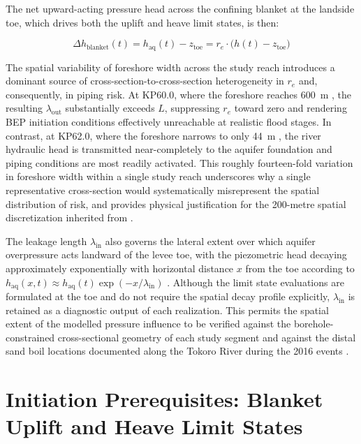 The net upward-acting pressure head across the confining blanket at the landside toe,
which drives both the uplift and heave limit states, is then:

$$\Delta h_\mathrm{blanket}(t) = h_\mathrm{aq}(t) - z_\mathrm{toe}
= r_e \cdot \bigl(h(t) - z_\mathrm{toe}\bigr)$$

The spatial variability of foreshore width across the study reach introduces a dominant
source of cross-section-to-cross-section heterogeneity in $r_e$ and, consequently, in
piping risk. At KP60.0, where the foreshore reaches 600~m \parencite{oyo_1999}, the
resulting $\lambda_\mathrm{out}$ substantially exceeds $L$, suppressing $r_e$ toward
zero and rendering BEP initiation conditions effectively unreachable at realistic flood
stages. In contrast, at KP62.0, where the foreshore narrows to only 44~m
\parencite{oyo_1999}, the river hydraulic head is transmitted near-completely to the
aquifer foundation and piping conditions are most readily activated. This roughly fourteen-fold
variation in foreshore width within a single study reach underscores why a single
representative cross-section would systematically misrepresent the spatial distribution
of risk, and provides physical justification for the 200-metre spatial discretization
inherited from \textcite{uemura_phd_2025}.

The leakage length $\lambda_\mathrm{in}$ also governs the lateral extent over which
aquifer overpressure acts landward of the levee toe, with the piezometric head decaying
approximately exponentially with horizontal distance $x$ from the toe according to
$h_\mathrm{aq}(x,t) \approx h_\mathrm{aq}(t) \exp(-x/\lambda_\mathrm{in})$
\parencite{bezuijen_2017}. Although the limit state evaluations are formulated at the
toe and do not require the spatial decay profile explicitly, $\lambda_\mathrm{in}$ is
retained as a diagnostic output of each realization. This permits the spatial extent of
the modelled pressure influence to be verified against the borehole-constrained
cross-sectional geometry of each study segment and against the distal sand boil
locations documented along the Tokoro River during the 2016 events
\parencite{kawajiri_2025}.

\section{Initiation Prerequisites: Blanket Uplift and Heave Limit States}
\label{sec: Initiation Prerequisites: Blanket Uplift and Heave Limit States}

